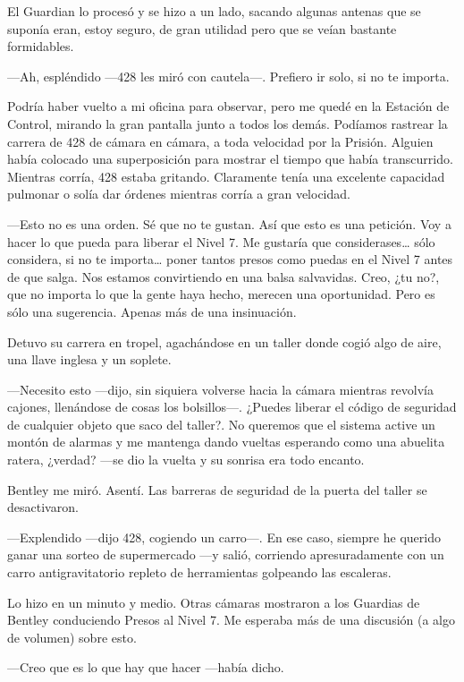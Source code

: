 El Guardian lo procesó y se hizo a un lado, sacando algunas antenas que
se suponía eran, estoy seguro, de gran utilidad pero que se veían
bastante formidables.

---Ah, espléndido ---428 les miró con cautela---. Prefiero ir solo, si
no te importa.

Podría haber vuelto a mi oficina para observar, pero me quedé en la
Estación de Control, mirando la gran pantalla junto a todos los demás.
Podíamos rastrear la carrera de 428 de cámara en cámara, a toda
velocidad por la Prisión. Alguien había colocado una superposición para
mostrar el tiempo que había transcurrido. Mientras corría, 428 estaba
gritando. Claramente tenía una excelente capacidad pulmonar o solía dar
órdenes mientras corría a gran velocidad.

---Esto no es una orden. Sé que no te gustan. Así que esto es una
petición. Voy a hacer lo que pueda para liberar el Nivel 7. Me gustaría
que considerases\ldots{} sólo considera, si no te importa\ldots{} poner
tantos presos como puedas en el Nivel 7 antes de que salga. Nos estamos
convirtiendo en una balsa salvavidas. Creo, ¿tu no?, que no importa lo
que la gente haya hecho, merecen una oportunidad. Pero es sólo una
sugerencia. Apenas más de una insinuación.

Detuvo su carrera en tropel, agachándose en un taller donde cogió algo
de aire, una llave inglesa y un soplete.

---Necesito esto ---dijo, sin siquiera volverse hacia la cámara mientras
revolvía cajones, llenándose de cosas los bolsillos---. ¿Puedes liberar
el código de seguridad de cualquier objeto que saco del taller?. No
queremos que el sistema active un montón de alarmas y me mantenga dando
vueltas esperando como una abuelita ratera, ¿verdad? ---se dio la vuelta
y su sonrisa era todo encanto.

Bentley me miró. Asentí. Las barreras de seguridad de la puerta del
taller se desactivaron.

---Explendido ---dijo 428, cogiendo un carro---. En ese caso, siempre he
querido ganar una sorteo de supermercado ---y salió, corriendo
apresuradamente con un carro antigravitatorio repleto de herramientas
golpeando las escaleras.

Lo hizo en un minuto y medio. Otras cámaras mostraron a los Guardias de
Bentley conduciendo Presos al Nivel 7. Me esperaba más de una discusión
(a algo de volumen) sobre esto.

---Creo que es lo que hay que hacer ---había dicho.

